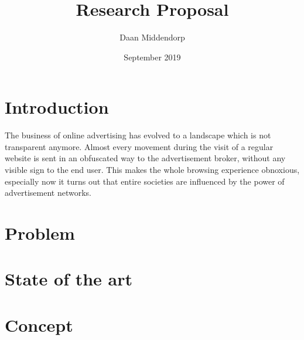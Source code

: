 \documentclass[]{article}
\title{Research Proposal}
\author{Daan Middendorp}
\date{September 2019}
\begin{document}
\maketitle

\begin{abstract}

\end{abstract}

\section{Introduction}

The business of online advertising has evolved to a landscape which is not transparent anymore. Almost every movement during the visit of a regular website is sent in an obfuscated way to the advertisement broker, without any visible sign to the end user. This makes the whole browsing experience obnoxious, especially now it turns out that entire societies are influenced by the power of advertisement networks.

\section{Problem}

\section{State of the art}

\section {Concept}
\end{document}
